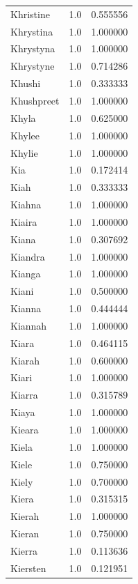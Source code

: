 \documentclass[
  letterpaper,
  DIV=11,
  numbers=noendperiod]{scrreprt}
\begin{document}
\begin{tabular}{lrr}
Khristine       &   1.0 &   0.555556 \\
Khrystina       &   1.0 &   1.000000 \\
Khrystyna       &   1.0 &   1.000000 \\
Khrystyne       &   1.0 &   0.714286 \\
Khushi          &   1.0 &   0.333333 \\
Khushpreet      &   1.0 &   1.000000 \\
Khyla           &   1.0 &   0.625000 \\
Khylee          &   1.0 &   1.000000 \\
Khylie          &   1.0 &   1.000000 \\
Kia             &   1.0 &   0.172414 \\
Kiah            &   1.0 &   0.333333 \\
Kiahna          &   1.0 &   1.000000 \\
Kiaira          &   1.0 &   1.000000 \\
Kiana           &   1.0 &   0.307692 \\
Kiandra         &   1.0 &   1.000000 \\
Kianga          &   1.0 &   1.000000 \\
Kiani           &   1.0 &   0.500000 \\
Kianna          &   1.0 &   0.444444 \\
Kiannah         &   1.0 &   1.000000 \\
Kiara           &   1.0 &   0.464115 \\
Kiarah          &   1.0 &   0.600000 \\
Kiari           &   1.0 &   1.000000 \\
Kiarra          &   1.0 &   0.315789 \\
Kiaya           &   1.0 &   1.000000 \\
Kieara          &   1.0 &   1.000000 \\
Kiela           &   1.0 &   1.000000 \\
Kiele           &   1.0 &   0.750000 \\
Kiely           &   1.0 &   0.700000 \\
Kiera           &   1.0 &   0.315315 \\
Kierah          &   1.0 &   1.000000 \\
Kieran          &   1.0 &   0.750000 \\
Kierra          &   1.0 &   0.113636 \\
Kiersten        &   1.0 &   0.121951 \\

\end{tabular}
\end{document}
